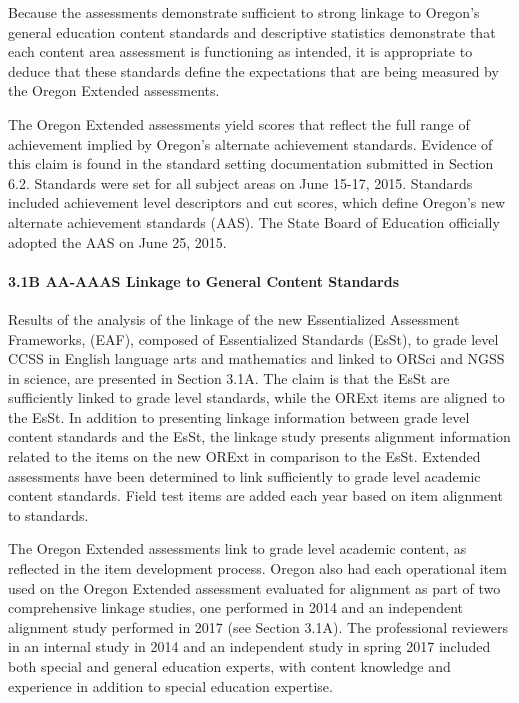 \documentclass[]{article}
\let\oldparagraph\paragraph
\renewcommand{\paragraph}[1]{\oldparagraph{#1}\mbox{}}
\begin{document}
Because the assessments demonstrate sufficient to strong linkage to
Oregon's general education content standards and descriptive statistics
demonstrate that each content area assessment is functioning as
intended, it is appropriate to deduce that these standards define the
expectations that are being measured by the Oregon Extended assessments.

The Oregon Extended assessments yield scores that reflect the full range
of achievement implied by Oregon's alternate achievement standards.
Evidence of this claim is found in the standard setting documentation
submitted in Section 6.2. Standards were set for all subject areas on
June 15-17, 2015. Standards included achievement level descriptors and
cut scores, which define Oregon's new alternate achievement standards
(AAS). The State Board of Education officially adopted the AAS on June
25, 2015.

\paragraph{3.1B AA-AAAS Linkage to General Content
Standards}\label{b-aa-aaas-linkage-to-general-content-standards}

Results of the analysis of the linkage of the new Essentialized
Assessment Frameworks, (EAF), composed of Essentialized Standards
(EsSt), to grade level CCSS in English language arts and mathematics and
linked to ORSci and NGSS in science, are presented in Section 3.1A. The
claim is that the EsSt are sufficiently linked to grade level standards,
while the ORExt items are aligned to the EsSt. In addition to presenting
linkage information between grade level content standards and the EsSt,
the linkage study presents alignment information related to the items on
the new ORExt in comparison to the EsSt. Extended assessments have been
determined to link sufficiently to grade level academic content
standards. Field test items are added each year based on item alignment
to standards.

The Oregon Extended assessments link to grade level academic content, as
reflected in the item development process. Oregon also had each
operational item used on the Oregon Extended assessment evaluated for
alignment as part of two comprehensive linkage studies, one performed in
2014 and an independent alignment study performed in 2017 (see Section
3.1A). The professional reviewers in an internal study in 2014 and an
independent study in spring 2017 included both special and general
education experts, with content knowledge and experience in addition to
special education expertise.
\end{document}

